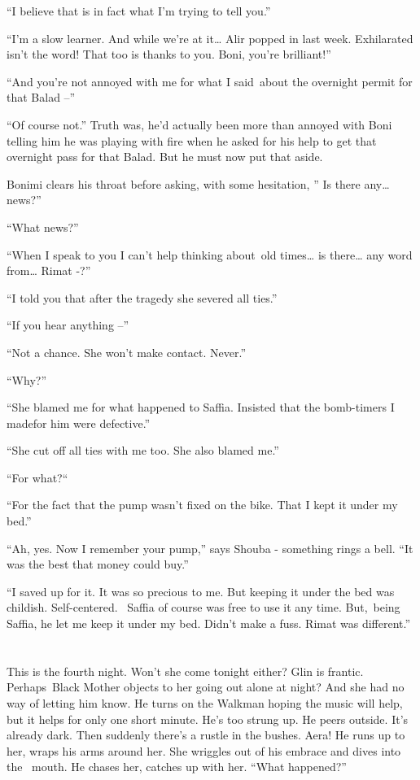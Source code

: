 \documentclass[twoside,11pt]{book}
\begin{document}
``I believe that is in fact what I'm trying to tell you.''

``I'm a slow learner. And while we're at it{\dots} Alir popped in last week. Exhilarated isn't the word!
That too is thanks to you. Boni, you're brilliant!''

``And you're not annoyed with me for what I said~about the overnight permit for that Balad
--''

``Of course not.'' Truth{ }was, he'd actually been more than annoyed with Boni
telling him he was playing with fire when he asked for his help to get that overnight pass for that{
}Balad. But he must now put that aside.

Bonimi clears his throat before asking, with some hesitation, '' Is there any{\dots} news?''

``What news?''

``When I speak to you I can't help thinking about~old times{\dots} is there{\dots} any word from{\dots}
Rimat -?''

``I told you that after the tragedy she severed all ties.''

``If you hear anything --''

``Not a chance. She won't make contact. Never.''

``Why?''

``She blamed me for what happened to Saffia. Insisted that the bomb-timers I madefor him were
defective.''

``She cut off all ties with me too. She also blamed me.''

``For what?``~

``For the fact that the pump wasn't fixed on the bike. That I kept it under my bed.''

``Ah, yes. Now I remember your pump,'' says Shouba - something rings a bell. ``It was the best that money
could buy.''

{}``I saved up for it. It was so precious to me. But keeping it under the bed was childish. Self-centered. \ Saffia of
course was free to use it any time. But,~being Saffia, he let me keep it under my bed. Didn't make a fuss. Rimat was
different.''


\bigskip

\chapter{}

This is the fourth night. Won't she come tonight either? Glin is frantic. Perhaps~Black Mother objects to her going out
alone at night? And she had no way of letting him know. He turns on the Walkman hoping the music will help, but it
helps for only one short minute. He's too strung up. He peers outside. It's already dark. Then suddenly there's a
rustle in the bushes. Aera! He runs up to her, wraps his arms around her. She wriggles out of his embrace and dives
into the \ mouth. He chases her, catches up with her. ``What happened?''
\end{document}

